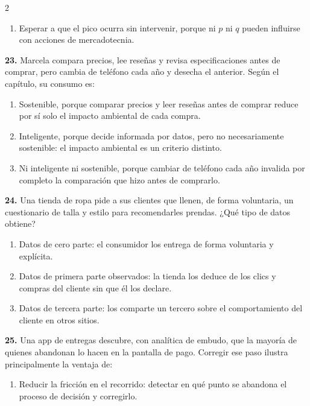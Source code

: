 \documentclass[10pt,letterpaper]{article}
\begin{document}
\begin{multicols}{2}
\begin{enumerate}[label=\alph*),leftmargin=1.1em,itemsep=0pt,topsep=1pt,parsep=0pt,partopsep=0pt]
\item Esperar a que el pico ocurra sin intervenir, porque ni $p$ ni $q$ pueden influirse con acciones de mercadotecnia.
\end{enumerate}
\vspace{2pt}
\noindent\textbf{23.} Marcela compara precios, lee reseñas y revisa especificaciones antes de comprar, pero cambia de teléfono cada año y desecha el anterior. Según el capítulo, su consumo es:
\vspace{-3pt}
\begin{enumerate}[label=\alph*),leftmargin=1.1em,itemsep=0pt,topsep=1pt,parsep=0pt,partopsep=0pt]
\item Sostenible, porque comparar precios y leer reseñas antes de comprar reduce por sí solo el impacto ambiental de cada compra.
\item Inteligente, porque decide informada por datos, pero no necesariamente sostenible: el impacto ambiental es un criterio distinto.
\item Ni inteligente ni sostenible, porque cambiar de teléfono cada año invalida por completo la comparación que hizo antes de comprarlo.
\end{enumerate}
\vspace{2pt}
\noindent\textbf{24.} Una tienda de ropa pide a sus clientes que llenen, de forma voluntaria, un cuestionario de talla y estilo para recomendarles prendas. ¿Qué tipo de datos obtiene?
\vspace{-3pt}
\begin{enumerate}[label=\alph*),leftmargin=1.1em,itemsep=0pt,topsep=1pt,parsep=0pt,partopsep=0pt]
\item Datos de cero parte: el consumidor los entrega de forma voluntaria y explícita.
\item Datos de primera parte observados: la tienda los deduce de los clics y compras del cliente sin que él los declare.
\item Datos de tercera parte: los comparte un tercero sobre el comportamiento del cliente en otros sitios.
\end{enumerate}
\vspace{2pt}
\noindent\textbf{25.} Una app de entregas descubre, con analítica de embudo, que la mayoría de quienes abandonan lo hacen en la pantalla de pago. Corregir ese paso ilustra principalmente la ventaja de:
\vspace{-3pt}
\begin{enumerate}[label=\alph*),leftmargin=1.1em,itemsep=0pt,topsep=1pt,parsep=0pt,partopsep=0pt]
\item Reducir la fricción en el recorrido: detectar en qué punto se abandona el proceso de decisión y corregirlo.

\end{enumerate}
\end{multicols}
\end{document}
